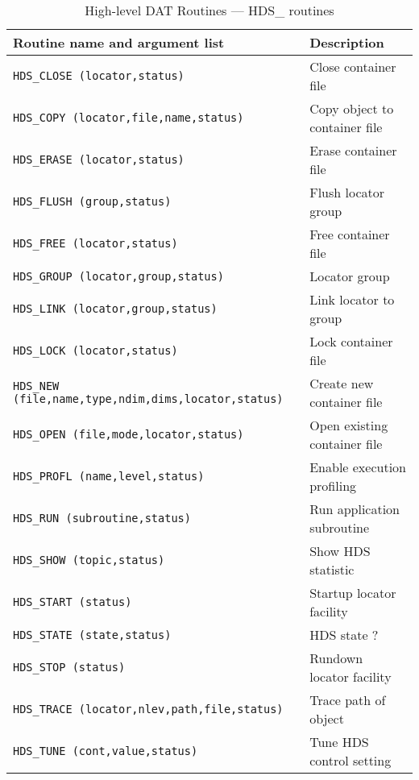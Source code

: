 \begin {table}[htbp]
\begin {center}
\begin {tabular}{||l|l||}
\hline
Routine name and argument list		& Description \\
\hline
{\tt HDS\_CLOSE (locator,status)}	& Close container file \\
{\tt HDS\_COPY (locator,file,name,status)} & Copy object to container file \\
{\tt HDS\_ERASE (locator,status)}	& Erase container file \\
{\tt HDS\_FLUSH (group,status)}	& Flush locator group \\
{\tt HDS\_FREE (locator,status)}	& Free container file \\
{\tt HDS\_GROUP (locator,group,status)}	& Locator group \\
{\tt HDS\_LINK (locator,group,status)}	& Link locator to group\\
{\tt HDS\_LOCK (locator,status)}	& Lock container file \\
{\tt HDS\_NEW (file,name,type,ndim,dims,locator,status)} & Create new container file \\
{\tt HDS\_OPEN (file,mode,locator,status)} & Open existing container file \\
{\tt HDS\_PROFL (name,level,status)}	& Enable execution profiling \\
{\tt HDS\_RUN (subroutine,status)}	& Run application subroutine \\
{\tt HDS\_SHOW (topic,status)}		& Show HDS statistic \\
{\tt HDS\_START (status)}		& Startup locator facility \\
{\tt HDS\_STATE (state,status)}		& HDS state ? \\
{\tt HDS\_STOP (status)}		& Rundown locator facility \\
{\tt HDS\_TRACE (locator,nlev,path,file,status)} & Trace path of object \\
{\tt HDS\_TUNE (cont,value,status)}	& Tune HDS control setting \\
\hline
\end {tabular}
\caption {High-level DAT Routines --- HDS\_ routines}
\label {high_level_dat_routines_hds_routines}
\end {center}
\end {table}

